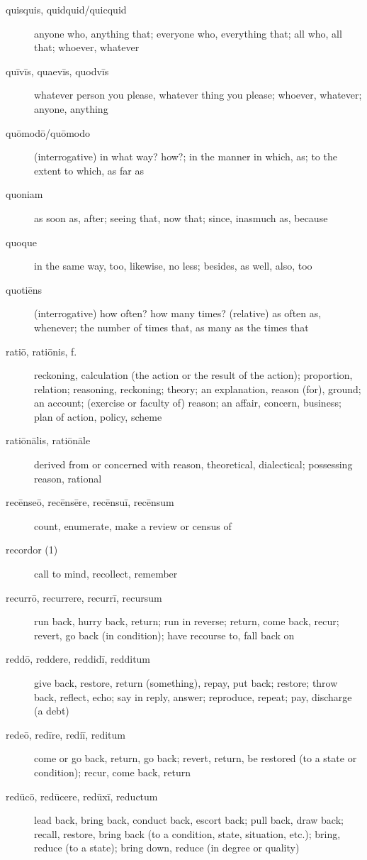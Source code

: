 \begin{description}
    \item[quisquis, quidquid/quicquid] anyone who, anything that; everyone who, everything that; all who, all that; whoever, whatever
    \item[quīvīs, quaevīs, quodvīs] whatever person you please, whatever thing you please; whoever, whatever; anyone, anything
    \item[quōmodō/quōmodo] (interrogative) in what way? how?; in the manner in which, as; to the extent to which, as far as
    \item[quoniam] as soon as, after; seeing that, now that; since, inasmuch as, because
    \item[quoque] in the same way, too, likewise, no less; besides, as well, also, too
    \item[quotiēns] (interrogative) how often? how many times? (relative) as often as, whenever; the number of times that, as many as the times that
    \item[ratiō, ratiōnis, f.] reckoning, calculation (the action or the result of the action); proportion, relation; reasoning, reckoning; theory; an explanation, reason (for), ground; an account; (exercise or faculty of) reason; an affair, concern, business; plan of action, policy, scheme
    \item[ratiōnālis, ratiōnāle] derived from or concerned with reason, theoretical, dialectical; possessing reason, rational
    \item[recēnseō, recēnsēre, recēnsuī, recēnsum] count, enumerate, make a review or census of
    \item[recordor (1)] call to mind, recollect, remember
    \item[recurrō, recurrere, recurrī, recursum] run back, hurry back, return; run in reverse; return, come back, recur; revert, go back (in condition); have recourse to, fall back on
    \item[reddō, reddere, reddidī, redditum] give back, restore, return (something), repay, put back; restore; throw back, reflect, echo; say in reply, answer; reproduce, repeat; pay, discharge (a debt)
    \item[redeō, redīre, rediī, reditum] come or go back, return, go back; revert, return, be restored (to a state or condition); recur, come back, return
    \item[redūcō, redūcere, redūxī, reductum] lead back, bring back,  conduct back, escort back; pull back, draw back; recall, restore, bring back (to a condition, state, situation, etc.); bring, reduce (to a state); bring down, reduce (in degree or quality)

\end{description}
